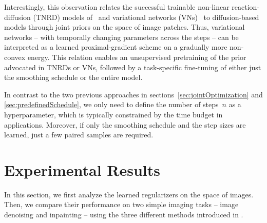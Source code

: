 \documentclass[nohyperref]{article}
\theoremstyle{plain}
\theoremstyle{definition}
\theoremstyle{remark}
\begin{document}
Interestingly, this observation relates the successful trainable non-linear reaction-diffusion (TNRD) models of~\citet{ChPo16} and variational networks (VNs)~\citep{KoKl17,HaKl18,EfKo20} to diffusion-based models through joint priors on the space of image patches.
Thus, variational networks -- with temporally changing parameters across the steps -- can be interpreted as a learned proximal-gradient scheme on a gradually more non-convex energy.
This relation enables an unsupervised pretraining of the prior advocated in TNRDs or VNs, followed by a task-specific fine-tuning of either just the smoothing schedule or the entire model.

In contrast to the two previous approaches in sections~\ref{sec:jointOptimization} and \ref{sec:predefinedSchedule}, we only need to define the number of steps~$n$ as a hyperparameter, which is typically constrained by the time budget in applications.
Moreover, if only the smoothing schedule and the step sizes are learned, just a few paired samples are required.


\section{Experimental Results}
In this section, we first analyze the learned regularizers on the space of images.
Then, we compare their performance on two simple imaging tasks -- image denoising and inpainting -- using the three different methods introduced in .
\end{document}
